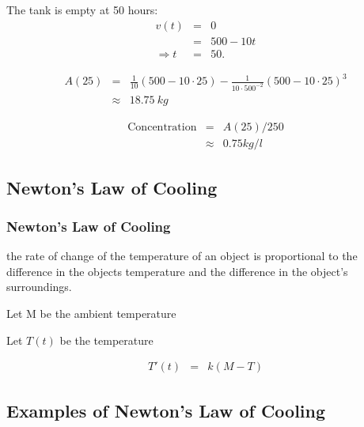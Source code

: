 \begin{frame}

  The tank is empty at 50 hours:
  \begin{eqnarray*}
    v(t) & = & 0 \\
    & = & 500-10t \\
    \Rightarrow t & = & 50.
  \end{eqnarray*}

  \begin{eqnarray*}
    A(25) & = & \frac{1}{10} (500-10\cdot 25) - \frac{1}{10\cdot500^{-2}} (500-10\cdot 25)^3 \\
    & \approx & 18.75 ~ kg
  \end{eqnarray*}

  \begin{eqnarray*}
    \mathrm{Concentration} & = & A(25)/250 \\
    & \approx & 0.75 kg/l
  \end{eqnarray*}

\end{frame}

\subsection{Newton's Law of Cooling}

\begin{frame}
  \frametitle{Newton's Law of Cooling}

  the rate of change of the temperature of an object is proportional
  to the difference in the objects temperature and the difference in
  the object's surroundings.

  Let M be the ambient temperature

  Let $T(t)$ be the temperature

  \begin{eqnarray*}
    T'(t) & = & k (M-T)
  \end{eqnarray*}


\end{frame}

\subsection{Examples of Newton's Law of Cooling}

